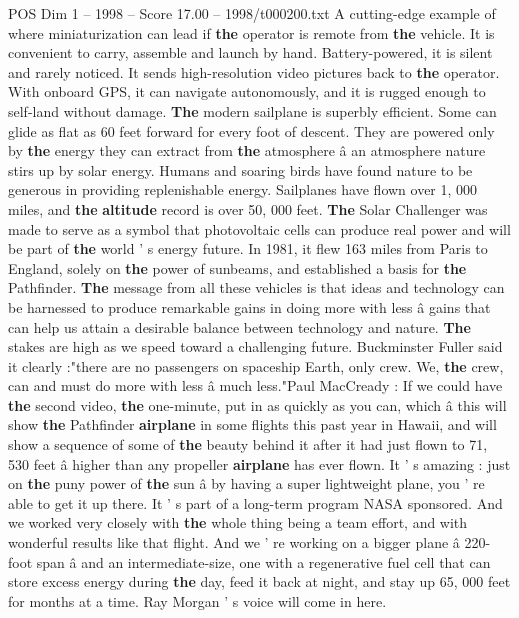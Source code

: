 \begin{textsample}{POS Dim 1 – 1998 – Score 17.00 – 1998/t000200.txt}
A cutting-edge example of where miniaturization can lead if \textbf{the} operator is remote from \textbf{the} vehicle.
It is convenient to carry, assemble and launch by hand.
Battery-powered, it is silent and rarely noticed.
It sends high-resolution video pictures back to \textbf{the} operator.
With onboard GPS, it can navigate autonomously, and it is rugged enough to self-land without damage. \textbf{The} modern sailplane is superbly efficient.
Some can glide as flat as 60 feet forward for every foot of descent.
They are powered only by \textbf{the} energy they can extract from \textbf{the} atmosphere â an atmosphere nature stirs up by solar energy.
Humans and soaring birds have found nature to be generous in providing replenishable energy.
Sailplanes have flown over 1, 000 miles, and \textbf{the} \textbf{altitude} record is over 50, 000 feet. \textbf{The} Solar Challenger was made to serve as a symbol that photovoltaic cells can produce real power and will be part of \textbf{the} world ' s energy future.
In 1981, it flew 163 miles from Paris to England, solely on \textbf{the} power of sunbeams, and established a basis for \textbf{the} Pathfinder. \textbf{The} message from all these vehicles is that ideas and technology can be harnessed to produce remarkable gains in doing more with less â gains that can help us attain a desirable balance between technology and nature. \textbf{The} stakes are high as we speed toward a challenging future.
Buckminster Fuller said it clearly :"there are no passengers on spaceship Earth, only crew.
We, \textbf{the} crew, can and must do more with less â much less."Paul MacCready : If we could have \textbf{the} second video, \textbf{the} one-minute, put in as quickly as you can, which â this will show \textbf{the} Pathfinder \textbf{airplane} in some flights this past year in Hawaii, and will show a sequence of some of \textbf{the} beauty behind it after it had just flown to 71, 530 feet â higher than any propeller \textbf{airplane} has ever flown.
It ' s amazing : just on \textbf{the} puny power of \textbf{the} sun â by having a super lightweight plane, you ' re able to get it up there.
It ' s part of a long-term program NASA sponsored.
And we worked very closely with \textbf{the} whole thing being a team effort, and with wonderful results like that flight.
And we ' re working on a bigger plane â 220-foot span â and an intermediate-size, one with a regenerative fuel cell that can store excess energy during \textbf{the} day, feed it back at night, and stay up 65, 000 feet for months at a time.
Ray Morgan ' s voice will come in here.

\end{textsample}
